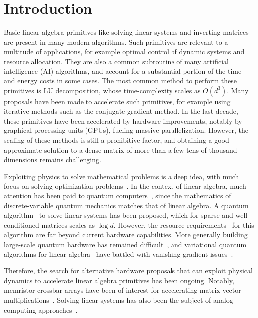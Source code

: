 \documentclass[prx,onecolumn,floatfix,longbibliography,notitlepage, nofootinbib,12pt]{revtex4-2}
\begin{document}
\section{Introduction}
Basic linear algebra primitives like solving linear systems and inverting matrices are present in many modern algorithms. Such primitives are relevant to a multitude of applications, for example optimal control of dynamic systems and resource allocation. They are also a common subroutine of many artificial intelligence (AI) algorithms, and account for a substantial portion of the time and energy costs in some cases. The most common method to perform these primitives is LU decomposition, whose time-complexity scales as $O(d^3)$. Many proposals have been made to accelerate such primitives, for example using iterative methods such as the conjugate gradient method. 
In the last decade, these primitives have been accelerated by hardware improvements, notably by graphical processing units (GPUs), fueling massive parallelization. However, the scaling of these methods is still a prohibitive factor, and obtaining a good approximate solution to a dense matrix of more than a few tens of thousand dimensions remains challenging.

Exploiting physics to solve mathematical problems is a deep idea, with much focus on solving optimization problems~\cite{vadlamani2020physics,mohseni2022ising,inagaki2016coherent}. In the context of linear algebra, much attention has been paid to quantum computers~\cite{feynman1982simulating}, since the mathematics of discrete-variable quantum mechanics matches that of linear algebra. A quantum algorithm~\cite{harrow2009quantum} to solve linear systems has been proposed, which for sparse and well-conditioned matrices scales as $\log d$. However, the resource requirements~\cite{scherer2017concrete} for this algorithm are far beyond current hardware capabilities. More generally building large-scale quantum hardware has remained difficult~\cite{preskill2018quantum}, and variational quantum algorithms for linear algebra~\cite{bravo2020variational,xu2019variational,cerezo2020variationalreview} have battled with vanishing gradient issues~\cite{mcclean2018barren,cerezo2020cost,wang2020noise}. 

Therefore, the search for alternative hardware proposals that can exploit physical dynamics to accelerate linear algebra primitives has been ongoing. Notably, memristor crossbar arrays have been of interest for accelerating matrix-vector multiplications~\cite{li2018analogue,yi2023activity}. Solving linear systems has also been the subject of analog computing approaches~\cite{huang2016evaluation}.
\end{document}
